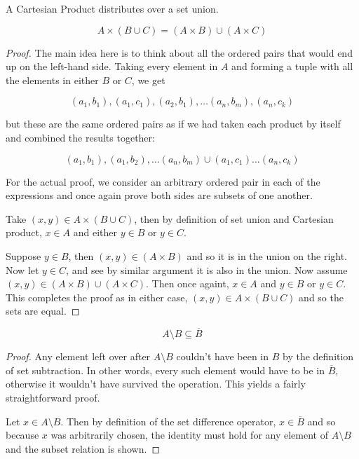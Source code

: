 \documentclass{standalone}
\begin{document}
\begin{theorem}
  A Cartesian Product distributes over a set union.

  \[
    A \times (B \cup C) = (A \times B) \cup (A \times C)
  \]
\end{theorem}

\begin{proof}
  The main idea here is to think about all the ordered pairs that would end up
  on the left-hand side. Taking every element in $A$ and forming a tuple with
  all the elements in either $B$ or $C$, we get

  \[
    (a_1, b_1), (a_1, c_1), (a_2, b_1), \dots (a_n, b_m), (a_n, c_k)
  \]

  but these are the same ordered pairs as if we had taken each product by itself
  and combined the results together:

  \[
    (a_1, b_1), (a_1, b_2), \dots (a_n, b_m) \cup (a_1, c_1) \dots (a_n, c_k)
  \]

  For the actual proof, we consider an arbitrary ordered pair in each of the
  expressions and once again prove both sides are subsets of one another.

  Take $(x, y) \in A \times (B \cup C)$, then by definition of set union and
  Cartesian product, $x \in A$ and either $y \in B$ or $y \in C$.

  Suppose $y \in B$, then $(x, y) \in (A \times B)$ and so it is in the union
  on the right. Now let $y \in C$, and see by similar argument it is also in
  the union. Now assume $(x, y) \in (A \times B) \cup (A \times C)$. Then once
  againt, $x \in A$ and $y \in B$ or $y \in C$. This completes the proof as in
  either case, $(x, y) \in A \times (B \cup C)$ and so the sets are equal.
\end{proof}

\begin{theorem}
  \[
    A \setminus B \subseteq \overline{B}
  \]
\end{theorem}

\begin{proof}
  Any element left over after $A \setminus B$ couldn't have been in $B$ by the
  definition of set subtraction. In other words, every such element would have
  to be in $\overline{B}$, otherwise it wouldn't have survived the operation. This
  yields a fairly straightforward proof.

  Let $x \in A \setminus B$. Then by definition of the set difference operator,
  $x \in \overline{B}$ and so because $x$ was arbitrarily chosen, the identity must
  hold for any element of $A \setminus B$ and the subset relation is shown.
\end{proof}
\end{document}
